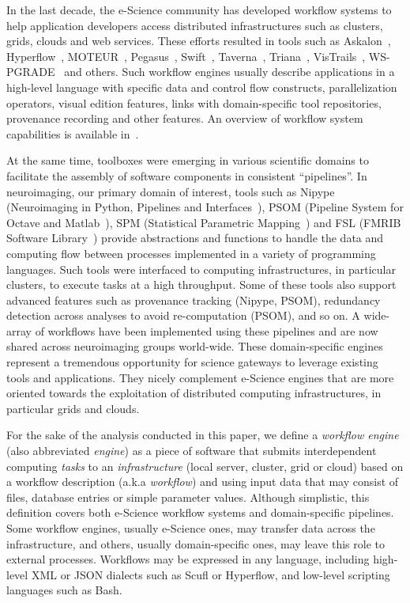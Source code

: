 \documentclass[preprint,3p,twocolumn]{elsarticle}
\newcommand{\note}[2]{\pdfmargincomment[color=yellow,author=#1,open=true]{#2}}
\newcommand{\closednote}[4]{} %
\begin{document}
In the last decade, the e-Science community has developed workflow
systems to help application developers access distributed
infrastructures such as clusters, grids, clouds and web
services. These efforts resulted in tools such as
Askalon~\cite{fahringer2005askalon},
Hyperflow~\cite{balis2016hyperflow}, MOTEUR~\cite{GLAT-08i},
Pegasus~\cite{deelman2005pegasus,Deelman201517},
Swift~\cite{zhao2007swift}, Taverna~\cite{oinn2004taverna},
Triana~\cite{taylor2007triana}, VisTrails~\cite{callahan2006managing},
WS-PGRADE~\cite{Kacsuk2012} and others. Such workflow engines usually
describe applications in a high-level language with specific data and
control flow constructs, parallelization operators, visual edition
features, links with domain-specific tool repositories, provenance
recording and other features. An overview of workflow system
capabilities is available in~\cite{deelman2009workflows}.

At the same time, toolboxes were emerging in various scientific
domains to facilitate the assembly of software components in
consistent ``pipelines''. In neuroimaging, our primary domain of
interest, tools such as Nipype (Neuroimaging in Python, Pipelines and
Interfaces~\cite{gorgolewski2011nipype}), PSOM (Pipeline System for
Octave and Matlab~\cite{bellec2012pipeline}), SPM (Statistical
Parametric Mapping~\cite{ashburner2011spm}) and FSL (FMRIB Software
Library~\cite{Jenkinson2012782}) provide abstractions and functions to
handle the data and computing flow between processes implemented in a
variety of programming languages. Such tools were interfaced to
computing infrastructures, in particular clusters\closednote{Tristan}{Reverted from Marc's 'cluster scheduler'}{}{}, to execute tasks at
a high throughput. Some of these tools also support
advanced features such as provenance tracking (Nipype, PSOM),
redundancy detection across analyses to avoid re-computation (PSOM),
and so on. A wide-array of workflows have been implemented using these
pipelines and are now shared across neuroimaging groups
world-wide. These domain-specific engines represent a tremendous
opportunity for science gateways to leverage existing tools and
applications. They nicely complement e-Science engines that are more
oriented towards the exploitation of distributed computing
infrastructures, in particular grids and clouds.

For the sake of the analysis conducted in this paper, we define a
\emph{workflow engine} (also abbreviated \emph{engine}) as a piece of
software that submits interdependent computing \emph{tasks} to an
\emph{infrastructure} (local server, cluster, grid or cloud) based on
a workflow description (a.k.a \emph{workflow}) and using input data
that may consist of files, database entries or simple parameter
values. Although simplistic, this definition covers both e-Science workflow systems and
domain-specific pipelines.\closednote{Marc-e}{To remain consistent with above descriptions}{Tristan}{yes!} Some workflow engines, usually e-Science
ones, may transfer data across the infrastructure, and others, usually
domain-specific ones, may leave this role to external processes. Workflows
may be expressed in any language, including high-level XML or JSON
dialects such as Scufl or Hyperflow, and low-level scripting languages
such as Bash.
\end{document}
